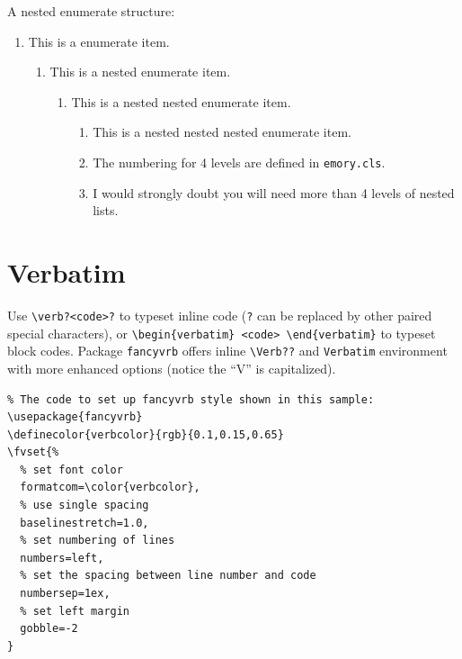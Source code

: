 \documentclass[final]{emory}
\begin{document}
A nested enumerate structure:
\begin{enumerate}
  \item This is a enumerate item.
  \begin{enumerate}
    \item This is a nested enumerate item.
    \begin{enumerate}
      \item This is a nested nested enumerate item.
      \begin{enumerate}
        \item This is a nested nested nested enumerate item. 
        \item The numbering for 4 levels are defined in \Verb|emory.cls|.
        \item I would strongly doubt you will need more than 4 levels of nested lists.
      \end{enumerate}
    \end{enumerate}
  \end{enumerate}    
\end{enumerate}

\section{Verbatim}

Use \Verb|\verb?<code>?| to typeset inline code  (\Verb|?| can be replaced by
other paired special characters),
or  \Verb|\begin{verbatim} <code> \end{verbatim}| to typeset block codes.
Package \Verb|fancyvrb| offers inline \Verb|\Verb??| and \Verb|Verbatim| environment with more enhanced
options (notice the ``V'' is capitalized).

\begin{Verbatim}
% The code to set up fancyvrb style shown in this sample:
\usepackage{fancyvrb}
\definecolor{verbcolor}{rgb}{0.1,0.15,0.65}
\fvset{%
  % set font color
  formatcom=\color{verbcolor},	
  % use single spacing
  baselinestretch=1.0,
  % set numbering of lines				  
  numbers=left,									
  % set the spacing between line number and code
  numbersep=1ex,
  % set left margin 							  
  gobble=-2											
}
\end{Verbatim}
\end{document}
